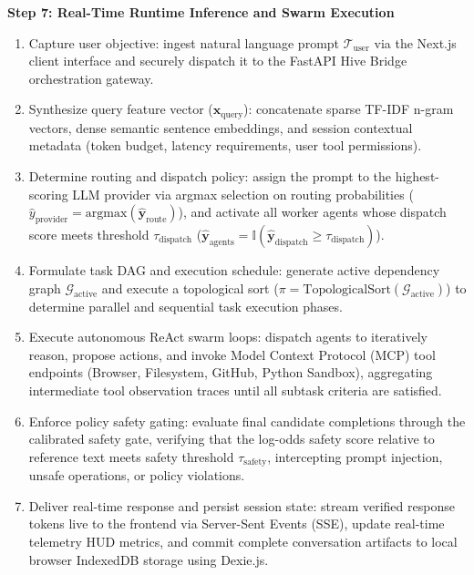 \documentclass[11pt,a4paper]{article}
\begin{document}
\vspace{0.40em}
\textbf{Step 7: Real-Time Runtime Inference and Swarm Execution}
\begin{enumerate}[leftmargin=1.8em, itemsep=0.22em, topsep=0.06em]
    \item Capture user objective: ingest natural language prompt $\mathcal{T}_{\text{user}}$ via the Next.js client interface and securely dispatch it to the FastAPI Hive Bridge orchestration gateway.
    \item Synthesize query feature vector ($\mathbf{x}_{\text{query}}$): concatenate sparse TF-IDF n-gram vectors, dense semantic sentence embeddings, and session contextual metadata (token budget, latency requirements, user tool permissions).
    \item Determine routing and dispatch policy: assign the prompt to the highest-scoring LLM provider via argmax selection on routing probabilities ($\hat{y}_{\text{provider}} = \mathrm{argmax}(\hat{\mathbf{y}}_{\text{route}})$), and activate all worker agents whose dispatch score meets threshold $\tau_{\text{dispatch}}$ ($\hat{\mathbf{y}}_{\text{agents}} = \mathbb{I}(\hat{\mathbf{y}}_{\text{dispatch}} \ge \tau_{\text{dispatch}})$).
    \item Formulate task DAG and execution schedule: generate active dependency graph $\mathcal{G}_{\text{active}}$ and execute a topological sort ($\pi = \mathrm{TopologicalSort}(\mathcal{G}_{\text{active}})$) to determine parallel and sequential task execution phases.
    \item Execute autonomous ReAct swarm loops: dispatch agents to iteratively reason, propose actions, and invoke Model Context Protocol (MCP) tool endpoints (Browser, Filesystem, GitHub, Python Sandbox), aggregating intermediate tool observation traces until all subtask criteria are satisfied.
    \item Enforce policy safety gating: evaluate final candidate completions through the calibrated safety gate, verifying that the log-odds safety score relative to reference text meets safety threshold $\tau_{\text{safety}}$, intercepting prompt injection, unsafe operations, or policy violations.
    \item Deliver real-time response and persist session state: stream verified response tokens live to the frontend via Server-Sent Events (SSE), update real-time telemetry HUD metrics, and commit complete conversation artifacts to local browser IndexedDB storage using Dexie.js.
\end{enumerate}
\end{document}
